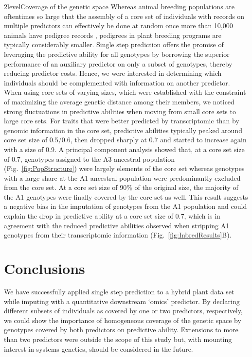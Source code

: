 \documentclass[12pt,titlepage]{article}
\begin{document}
\Genetics2level{Coverage of the genetic space}
Whereas animal breeding populations are oftentimes so large that the assembly 
of a core set of individuals with records on multiple predictors can effectively 
be done at random once more than 10,000 animals have pedigree records 
\cite{Fragomeni2015,Lourenco2015,Masuda2016}, pedigrees in plant breeding 
programs are typically considerably smaller.
Single step prediction offers the promise of leveraging the predictive ability
for all genotypes by borrowing the superior performance of an auxiliary
predictor on only a subset of genotypes, thereby reducing predictor costs.
Hence, we were interested in determining which individuals should be 
complemented with information on another predictor.
When using core sets of varying sizes, which were established with the
constraint of maximizing the average genetic distance among their members, we
noticed strong fluctuations in predictive abilities when moving from small core
sets to large core sets.
For traits that were better predicted by transcriptomic than by genomic
information in the core set, predictive abilities typically peaked around
core set size of 0.5/0.6, then dropped sharply at 0.7 and started to increase
again with a size of 0.9.
A principal component analysis showed that, at a core set size of 0.7, 
genotypes assigned to the A3 ancestral population (Fig.~\ref{fig:PopStructure})
were largely elements of the core set whereas genotypes with a large share at 
the A1 ancestral population were predominantly excluded from the core set.
At a core set size of 90\% of the original size, the majority of the A1
genotypes were finally covered by the core set as well.
This result suggests a negative bias in the imputation of genotypes from the A1
population and could explain the drop in predictive ability at a core set size
of 0.7, which is in agreement with the reduced predictive abilities observed
when stripping A1 genotypes from their transcriptomic information
(Fig.~\ref{fig:InbredResults}B).



\section*{Conclusions}
We have successfully applied single step prediction to a hybrid plant data set 
while imputing with a quantitative downstream `omics' predictor.
By declaring different subsets of individuals as covered by one or two 
predictors, respectively, we could show the importance of homogeneous coverage
of the genetic space by genotypes covered by both predictors on predictive
ability.
Extensions to more than two predictors were outside the scope of this study
but, with mounting interest in systems genetics, should be considered in the
future.
\end{document}

